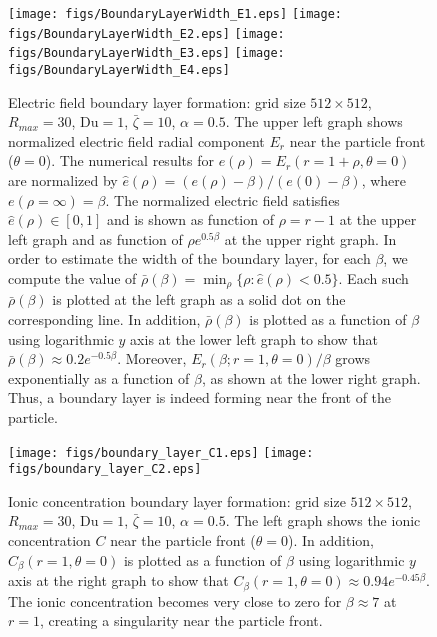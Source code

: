 \documentclass[MSc,beforeExam]{iitcsthesis}
\newcommand\Du{\text{Du}}
\begin{document}
\begin{figure}
    \begin{center}
    \texttt{[image: figs/BoundaryLayerWidth\_E1.eps]}
    \texttt{[image: figs/BoundaryLayerWidth\_E2.eps]}
    \texttt{[image: figs/BoundaryLayerWidth\_E3.eps]}
    \texttt{[image: figs/BoundaryLayerWidth\_E4.eps]}
        \caption[Electric field boundary layer]
        {Electric field boundary layer formation: grid size $512 \times 512$, 
        $R_{max} = 30$, $\Du = 1$, $\bar\zeta = 10$, $\alpha = 0.5$. The upper left
        graph shows normalized electric field radial component $E_r$ near the particle front
        ($\theta = 0$). The numerical results for $e(\rho) = E_r(r=1+\rho, \theta=0)$
        are normalized by $\hat{e}(\rho) = \left(e(\rho) - \beta\right)/\left(e(0) - \beta\right)$,
        where $e(\rho = \infty) = \beta$.
        The normalized electric field satisfies $\hat{e}(\rho) \in [0, 1]$ and is shown as function
        of $\rho = r - 1$ at the upper left graph and as function of $\rho e^{0.5 \beta}$ at
        the upper right graph.
        In order to estimate the width of the boundary layer, for each $\beta$, we compute the value 
        of $\bar\rho(\beta) = \min_\rho \{ \rho : \hat{e}(\rho) < 0.5\}$. Each such $\bar\rho(\beta)$
        is plotted at the left graph as a solid dot on the corresponding line.
        In addition, $\bar\rho(\beta)$ is plotted as a function of $\beta$ using logarithmic 
        $y$ axis at the lower left graph to show that $\bar\rho(\beta) \approx 0.2 e^{-0.5 \beta}$.
        Moreover, $E_r(\beta; r=1, \theta=0) / \beta$ grows exponentially as a function of $\beta$,
        as shown at the lower right graph.
        Thus, a boundary layer is indeed forming near the front of the particle.
        }
	    \label{fig:LargeBeta_BoundaryLayer_E}	    
    \end{center}
\end{figure}


\begin{figure}
    \begin{center}
    \texttt{[image: figs/boundary\_layer\_C1.eps]}
    \texttt{[image: figs/boundary\_layer\_C2.eps]}
        \caption[Ionic concentration boundary layer]
        {Ionic concentration boundary layer formation: grid size $512 \times 512$, 
        $R_{max} = 30$, $\Du = 1$, $\bar\zeta = 10$, $\alpha = 0.5$. The left
        graph shows the ionic concentration $C$ near the particle front
        ($\theta = 0$). 
        In addition, $C_\beta(r=1, \theta=0)$ is plotted as a function of $\beta$ using logarithmic 
        $y$ axis at the right graph to show that 
        $C_\beta(r=1, \theta=0) \approx 0.94 e^{-0.45 \beta}$.
        The ionic concentration becomes very close to zero for $\beta \approx 7$ at $r = 1$, 
        creating a singularity near the particle front.
        }
	    \label{fig:LargeBeta_BoundaryLayer_C}	    
    \end{center}
\end{figure}
\end{document}
